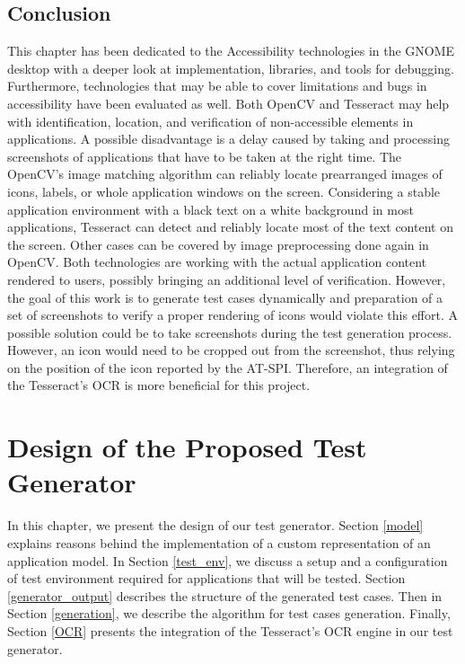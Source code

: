 \section{Conclusion}\label{ocr_conclusion}
This chapter has been dedicated to the Accessibility technologies in the GNOME desktop with a deeper look at implementation, libraries, and tools for debugging. Furthermore, technologies that may be able to cover limitations and bugs in accessibility have been evaluated as well. Both OpenCV and Tesseract may help with identification, location, and verification of non-accessible elements in applications. A possible disadvantage is a delay caused by taking and processing screenshots of applications that have to be taken at the right time. The OpenCV's image matching algorithm can reliably locate prearranged images of icons, labels, or whole application windows on the screen. Considering a stable application environment with a black text on a white background in most applications, Tesseract can detect and reliably locate most of the text content on the screen. Other cases can be covered by image preprocessing done again in OpenCV. Both technologies are working with the actual application content rendered to users, possibly bringing an additional level of verification. However, the goal of this work is to generate test cases dynamically and preparation of a set of screenshots to verify a proper rendering of icons would violate this effort. A possible solution could be to take screenshots during the test generation process. However, an icon would need to be cropped out from the screenshot, thus relying on the position of the icon reported by the AT-SPI. Therefore, an integration of the Tesseract's OCR is more beneficial for this project.

\chapter{Design of the Proposed Test Generator}\label{proposed_solution}
In this chapter, we present the design of our test generator. Section \ref{model} explains reasons behind the implementation of a custom representation of an application model. In Section \ref{test_env}, we discuss a setup and a configuration of test environment required for applications that will be tested. Section \ref{generator_output} describes the structure of the generated test cases. Then in  Section \ref{generation}, we describe the algorithm for test cases generation. Finally, Section \ref{OCR} presents the integration of the Tesseract's OCR engine in our test generator.  

